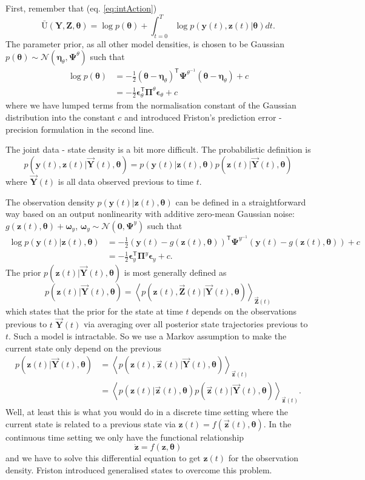 \documentclass[a4paper,10pt]{article}
\newcommand{\bs}[1]{\mathbf{#1}}					%
\newcommand{\bgs}[1]{\boldsymbol{#1}}				%
\newcommand{\tr}{\mathsf{T}}				%
\newcommand{\eq}[1]{\begin{equation} #1 \end{equation}}%
\renewcommand{\ss}{z}         %
\newcommand{\so}{y}         %
\newcommand{\spe}{\epsilon} %
\renewcommand{\sp}{\theta}    %
\newcommand{\ps}{\bs{\ss}}    %
\newcommand{\po}{\bs{\so}}    %
\newcommand{\ppe}{\bgs{\spe}} %
\newcommand{\pp}{\bgs{\sp}} %
\newcommand{\Ps}{\bs{Z}}    %
\newcommand{\Po}{\bs{Y}}    %
\newcommand{\E}[2][]{\left\langle #2 \right\rangle_{#1}}	%
\newcommand{\Ua}{\bar{\mathrm{U}}}		%
\newcommand{\N}{\mathcal{N}}			%
\newcommand{\Prec}{\bgs{\Pi}}			%
\begin{document}
First, remember that (eq. \ref{eq:intAction})
\[
    \Ua(\Po,\Ps,\pp) = \log p(\pp) + \int_{t=0}^T \log p(\po(t),\ps(t)|\pp)dt.
\]
The parameter prior, as all other model densities, is chosen to be Gaussian $p(\pp)\sim \N(\bgs{\eta}_\sp,\bgs{\Psi}^\sp)$ such that 
\begin{align}
    \log p(\pp) &= -\frac{1}{2}(\pp - \bgs{\eta}_\sp)^\tr\bgs{\Psi}^{\sp^{-1}}(\pp - \bgs{\eta}_\sp) + c\\
    &= -\frac{1}{2}\ppe_\sp^\tr\Prec^{\sp}\ppe_\sp + c
\end{align}
where we have lumped terms from the normalisation constant of the Gaussian distribution into the constant $c$ and introduced Friston's prediction error - precision formulation in the second line.

The joint data - state density is a bit more difficult. The probabilistic definition is
\eq{
    p(\po(t),\ps(t)|\vec{\Po}(t),\pp) = p(\po(t)|\ps(t),\pp)p(\ps(t)|\vec{\Po}(t),\pp)
}
where $\vec{\Po}(t)$ is all data observed previous to time $t$.

The observation density $p(\po(t)|\ps(t),\pp)$ can be defined in a straightforward way based on an output nonlinearity with additive zero-mean Gaussian noise: $g(\ps(t),\pp)+\bgs{\omega}_\so$, $\bgs{\omega}_\so\sim \N(\bs{0},\bgs{\Psi}^\so)$ such that
\begin{align}
    \log p(\po(t)|\ps(t),\pp) &= -\frac{1}{2}(\po(t) - g(\ps(t),\pp))^\tr\bgs{\Psi}^{\so^{-1}}(\po(t) - g(\ps(t),\pp)) + c\\
    &= -\frac{1}{2}\ppe_\so^\tr\Prec^{\so}\ppe_\so + c.
\end{align}
The prior $p(\ps(t)|\vec{\Po}(t),\pp)$ is most generally defined as
\eq{
    p(\ps(t)|\vec{\Po}(t),\pp) = \E[\vec{\Ps}(t)]{p(\ps(t),\vec{\Ps}(t)|\vec{\Po}(t),\pp)}
}
which states that the prior for the state at time $t$ depends on the observations previous to $t$ $\vec{\Po}(t)$ via averaging over all posterior state trajectories previous to $t$. Such a model is intractable. So we use a Markov assumption to make the current state only depend on the previous
\begin{align}
    p(\ps(t)|\vec{\Po}(t),\pp) &= \E[\vec{\ps}(t)]{p(\ps(t),\vec{\ps}(t)|\vec{\Po}(t),\pp)}\\
    &= \label{eq:statePrior} \E[\vec{\ps}(t)]{p(\ps(t)|\vec{\ps}(t),\pp)p(\vec{\ps}(t)|\vec{\Po}(t),\pp)}.
\end{align}
Well, at least this is what you would do in a discrete time setting where the current state is related to a previous state via $\ps(t) = f(\vec{\ps}(t),\pp)$. In the continuous time setting we only have the functional relationship
\eq{
    \dot{\ps} = f(\ps,\pp)
}
and we have to solve this differential equation to get $\ps(t)$ for the observation density. Friston introduced generalised states to overcome this problem. 
\end{document}
